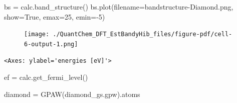 \documentclass[
  letterpaper,
  DIV=11,
  numbers=noendperiod]{scrreprt}
\newenvironment{Shaded}{\begin{snugshade}}{\end{snugshade}}
\newcommand{\DecValTok}[1]{\textcolor[rgb]{0.68,0.00,0.00}{#1}}
\newcommand{\NormalTok}[1]{\textcolor[rgb]{0.00,0.23,0.31}{#1}}
\newcommand{\OperatorTok}[1]{\textcolor[rgb]{0.37,0.37,0.37}{#1}}
\newcommand{\StringTok}[1]{\textcolor[rgb]{0.13,0.47,0.30}{#1}}
\newcommand{\VariableTok}[1]{\textcolor[rgb]{0.07,0.07,0.07}{#1}}
\begin{document}
\begin{Shaded}
\begin{Highlighting}[]
\NormalTok{bs }\OperatorTok{=}\NormalTok{ calc.band\_structure()}
\NormalTok{bs.plot(filename}\OperatorTok{=}\StringTok{\textquotesingle{}bandstructure{-}Diamond.png\textquotesingle{}}\NormalTok{, show}\OperatorTok{=}\VariableTok{True}\NormalTok{, emax}\OperatorTok{=}\DecValTok{25}\NormalTok{, emin}\OperatorTok{={-}}\DecValTok{5}\NormalTok{)}
\end{Highlighting}
\end{Shaded}

\begin{figure}[H]

{\centering \texttt{[image: ./QuantChem\_DFT\_EstBandyHib\_files/figure-pdf/cell-6-output-1.png]}

}

\end{figure}

\begin{verbatim}
<Axes: ylabel='energies [eV]'>
\end{verbatim}

\begin{Shaded}
\begin{Highlighting}[]
\NormalTok{ef }\OperatorTok{=}\NormalTok{ calc.get\_fermi\_level()}
\end{Highlighting}
\end{Shaded}

\begin{Shaded}
\begin{Highlighting}[]
\NormalTok{diamond }\OperatorTok{=}\NormalTok{  GPAW(}\StringTok{\textquotesingle{}diamond\_gs.gpw\textquotesingle{}}\NormalTok{).atoms}
\end{Highlighting}
\end{Shaded}
\end{document}
